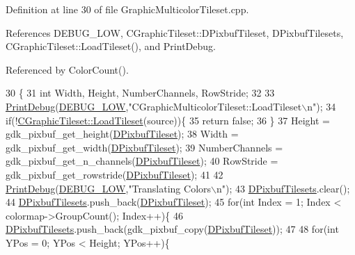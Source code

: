 Definition at line 30 of file Graphic\+Multicolor\+Tileset.\+cpp.



References D\+E\+B\+U\+G\+\_\+\+L\+OW, C\+Graphic\+Tileset\+::\+D\+Pixbuf\+Tileset, D\+Pixbuf\+Tilesets, C\+Graphic\+Tileset\+::\+Load\+Tileset(), and Print\+Debug.



Referenced by Color\+Count().


\begin{DoxyCode}
30                                                                                                            
                       \{
31     \textcolor{keywordtype}{int} Width, Height, NumberChannels, RowStride;
32     
33     \hyperlink{Debug_8h_aa5f00f5537c9760f6ae1782460748ab9}{PrintDebug}(\hyperlink{Debug_8h_a3a5f3fc09784650d8388cb854882f840}{DEBUG\_LOW},\textcolor{stringliteral}{"CGraphicMulticolorTileset::LoadTileset\(\backslash\)n"}); 
34     \textcolor{keywordflow}{if}(!\hyperlink{classCGraphicTileset_a7d47754f26f03958be28a064f54eef1d}{CGraphicTileset::LoadTileset}(source))\{
35         \textcolor{keywordflow}{return} \textcolor{keyword}{false};
36     \}
37     Height = gdk\_pixbuf\_get\_height(\hyperlink{classCGraphicTileset_a5d5adfcdbb347a6df3f57535ca08e3ef}{DPixbufTileset});
38     Width = gdk\_pixbuf\_get\_width(\hyperlink{classCGraphicTileset_a5d5adfcdbb347a6df3f57535ca08e3ef}{DPixbufTileset});
39     NumberChannels = gdk\_pixbuf\_get\_n\_channels(\hyperlink{classCGraphicTileset_a5d5adfcdbb347a6df3f57535ca08e3ef}{DPixbufTileset});
40     RowStride = gdk\_pixbuf\_get\_rowstride(\hyperlink{classCGraphicTileset_a5d5adfcdbb347a6df3f57535ca08e3ef}{DPixbufTileset});
41     
42     \hyperlink{Debug_8h_aa5f00f5537c9760f6ae1782460748ab9}{PrintDebug}(\hyperlink{Debug_8h_a3a5f3fc09784650d8388cb854882f840}{DEBUG\_LOW},\textcolor{stringliteral}{"Translating Colors\(\backslash\)n"}); 
43     \hyperlink{classCGraphicMulticolorTileset_a30809d113b0f314944425a3c8f21408c}{DPixbufTilesets}.clear();
44     \hyperlink{classCGraphicMulticolorTileset_a30809d113b0f314944425a3c8f21408c}{DPixbufTilesets}.push\_back(\hyperlink{classCGraphicTileset_a5d5adfcdbb347a6df3f57535ca08e3ef}{DPixbufTileset});
45     \textcolor{keywordflow}{for}(\textcolor{keywordtype}{int} Index = 1; Index < colormap->GroupCount(); Index++)\{
46         \hyperlink{classCGraphicMulticolorTileset_a30809d113b0f314944425a3c8f21408c}{DPixbufTilesets}.push\_back(gdk\_pixbuf\_copy(\hyperlink{classCGraphicTileset_a5d5adfcdbb347a6df3f57535ca08e3ef}{DPixbufTileset}));
47         
48         \textcolor{keywordflow}{for}(\textcolor{keywordtype}{int} YPos = 0; YPos < Height; YPos++)\{

\end{DoxyCode}
